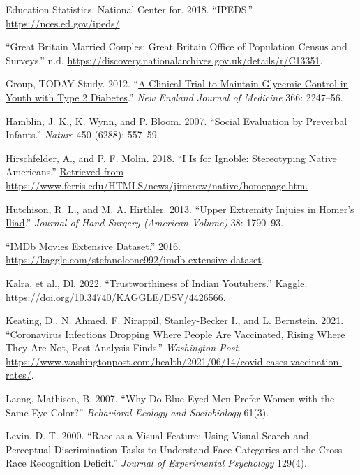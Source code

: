 \documentclass[
]{report}
\newlength{\cslhangindent}
\newenvironment{CSLReferences}[2] %
 {\begin{list}{}{%
  \setlength{\itemindent}{0pt}
  \setlength{\leftmargin}{0pt}
  \setlength{\parsep}{0pt}
  \ifodd #1
   \setlength{\leftmargin}{\cslhangindent}
   \setlength{\itemindent}{-1\cslhangindent}
  \fi
  \setlength{\itemsep}{#2\baselineskip}}}
 {\end{list}}
\begin{document}
\begin{CSLReferences}{1}{0}
Education Statistics, National Center for. 2018. {``IPEDS.''} \url{https://nces.ed.gov/ipeds/}.

{``Great Britain Married Couples: Great Britain Office of Population Census and Surveys.''} n.d. \url{https://discovery.nationalarchives.gov.uk/details/r/C13351}.

Group, TODAY Study. 2012. {``\href{https://www.ncbi.nlm.nih.gov/pubmed/22540912}{A Clinical Trial to Maintain Glycemic Control in Youth with Type 2 Diabetes}.''} \emph{New England Journal of Medicine} 366: 2247--56.

Hamblin, J. K., K. Wynn, and P. Bloom. 2007. {``Social Evaluation by Preverbal Infants.''} \emph{Nature} 450 (6288): 557--59.

Hirschfelder, A., and P. F. Molin. 2018. {``I Is for Ignoble: Stereotyping Native Americans.''} \href{Retrieved\%20from\%20https://www.ferris.edu/HTMLS/news/jimcrow/native/homepage.htm.}{Retrieved from https://www.ferris.edu/HTMLS/news/jimcrow/native/homepage.htm.}

Hutchison, R. L., and M. A. Hirthler. 2013. {``\href{https://www.ncbi.nlm.nih.gov/pubmed/23932117}{Upper Extremity Injuies in Homer's Iliad}.''} \emph{Journal of Hand Surgery (American Volume)} 38: 1790--93.

{``{IMDb} Movies Extensive Dataset.''} 2016. \url{https://kaggle.com/stefanoleone992/imdb-extensive-dataset}.

Kalra, et al., Dl. 2022. {``Trustworthiness of Indian Youtubers.''} Kaggle. \url{https://doi.org/10.34740/KAGGLE/DSV/4426566}.

Keating, D., N. Ahmed, F. Nirappil, Stanley-Becker I., and L. Bernstein. 2021. {``Coronavirus Infections Dropping Where People Are Vaccinated, Rising Where They Are Not, Post Analysis Finds.''} \emph{Washington Post}. \url{https://www.washingtonpost.com/health/2021/06/14/covid-cases-vaccination-rates/}.

Laeng, Mathisen, B. 2007. {``Why Do Blue-Eyed Men Prefer Women with the Same Eye Color?''} \emph{Behavioral Ecology and Sociobiology} 61(3).

Levin, D. T. 2000. {``Race as a Visual Feature: Using Visual Search and Perceptual Discrimination Tasks to Understand Face Categories and the Cross-Race Recognition Deficit.''} \emph{Journal of Experimental Psychology} 129(4).


\end{CSLReferences}
\end{document}
